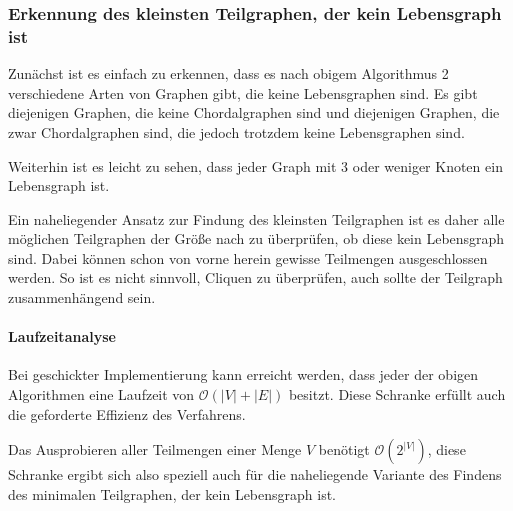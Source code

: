 \subsubsection{Erkennung des kleinsten Teilgraphen, der kein Lebensgraph ist} 

Zunächst ist es einfach zu erkennen, dass es nach obigem Algorithmus 2 verschiedene Arten von Graphen gibt, die keine Lebensgraphen sind. Es gibt diejenigen Graphen, die keine Chordalgraphen sind und diejenigen Graphen, die zwar Chordalgraphen sind, die jedoch trotzdem keine Lebensgraphen sind.

Weiterhin ist es leicht zu sehen, dass jeder Graph mit 3 oder weniger Knoten ein Lebensgraph ist.

Ein naheliegender Ansatz zur Findung des kleinsten Teilgraphen ist es daher alle möglichen Teilgraphen der Größe nach zu überprüfen, ob diese kein Lebensgraph sind. Dabei können schon von vorne herein gewisse Teilmengen ausgeschlossen werden. So ist es nicht sinnvoll, Cliquen zu überprüfen, auch sollte der Teilgraph zusammenhängend sein.

 
\paragraph{Laufzeitanalyse}

Bei geschickter Implementierung kann erreicht werden, dass jeder der obigen Algorithmen eine Laufzeit von $\mathcal{O}(|V| + |E|)$ besitzt. Diese Schranke erfüllt auch die geforderte Effizienz des Verfahrens.

Das Ausprobieren aller Teilmengen einer Menge $V$ benötigt $\mathcal{O}(2^{|V|})$, diese Schranke ergibt sich also speziell auch für die naheliegende Variante des Findens des minimalen Teilgraphen, der kein Lebensgraph ist.

